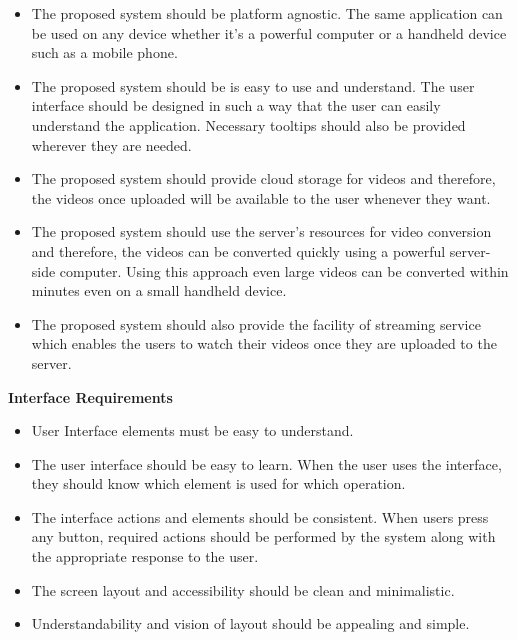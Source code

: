 			\begin{itemize}
				\item The proposed system should be platform agnostic. The same application can be used on any device whether it's a powerful computer or a handheld device such as a mobile phone.
				
				\item The proposed system should be is easy to use and understand. The user interface should be designed in such a way that the user can easily understand the application. Necessary tooltips should also be provided wherever they are needed.
				\item The proposed system should provide cloud storage for videos and therefore, the videos once uploaded will be available to the user whenever they want. 
				\item The proposed system should use the server’s resources for video conversion and therefore, the videos can be converted quickly using a powerful server-side computer. Using this approach even large videos can be converted within minutes even on a small handheld device.
				\item The proposed system should also provide the facility of streaming service which enables the users to watch their videos once they are uploaded to the server.
			\end{itemize}
			\vs
			\large\textbf{Interface Requirements}
			\vs
			\begin{itemize}
				\item User Interface elements must be easy to understand.
				\item The user interface should be easy to learn. When the user uses the interface, they
				should know which element is used for which operation.
				\item The interface actions and elements should be consistent. When users press any
				button, required actions should be performed by the system along with
				the appropriate response to the user.
				\item The screen layout and accessibility should be clean and minimalistic.
				\item Understandability and vision of layout should be appealing and simple.
			\end{itemize}
		\vs
